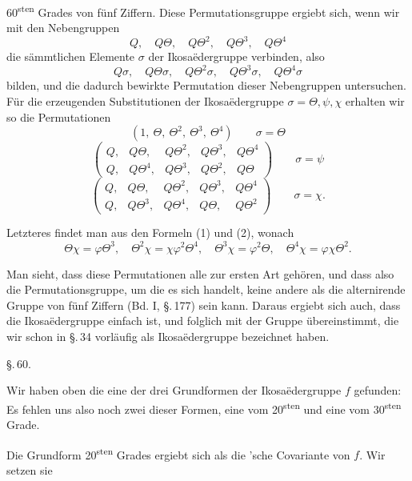 60\textsuperscript{sten} Grades von fünf Ziffern. Diese Permutationsgruppe ergiebt sich, wenn wir mit den Nebengruppen
\[
Q, \quad Q\Theta, \quad Q\Theta^2, \quad Q\Theta^3, \quad Q\Theta^4
\]
die sämmtlichen Elemente $\sigma$ der Ikosa\"edergruppe verbinden, also
\[
Q\sigma, \quad Q\Theta\sigma, \quad Q\Theta^2\sigma, \quad Q\Theta^3\sigma, \quad Q\Theta^4\sigma
\]
bilden, und die dadurch bewirkte Permutation dieser Nebengruppen untersuchen. Für die erzeugenden Substitutionen der Ikosa\"edergruppe $\sigma = \Theta, \psi, \chi$ erhalten wir so die Permutationen
\[
(1, \ \Theta, \ \Theta^2, \ \Theta^3, \ \Theta^4) \qquad \sigma = \Theta
\]
\[
\begin{pmatrix} Q, & Q\Theta, & Q\Theta^2, & Q\Theta^3, & Q\Theta^4 \\ Q, & Q\Theta^4, & Q\Theta^3, & Q\Theta^2, & Q\Theta \end{pmatrix} \qquad \sigma = \psi
\]
\[
\begin{pmatrix} Q, & Q\Theta, & Q\Theta^2, & Q\Theta^3, & Q\Theta^4 \\ Q, & Q\Theta^3, & Q\Theta^4, & Q\Theta, & Q\Theta^2 \end{pmatrix} \qquad \sigma = \chi.
\]

Letzteres findet man aus den Formeln (1) und (2), wonach
\[
\Theta\chi = \varphi\Theta^3, \quad \Theta^2\chi = \chi\varphi^2\Theta^4, \quad \Theta^3\chi = \varphi^2\Theta, \quad \Theta^4\chi = \varphi\chi\Theta^2.
\]

Man sieht, dass diese Permutationen alle zur ersten Art gehören, und dass also die Permutationsgruppe, um die es sich handelt, keine andere als die alternirende Gruppe von fünf Ziffern (Bd. I, \S.\,177) sein kann. Daraus ergiebt sich auch, dass die Ikosa\"edergruppe einfach ist, und folglich mit der Gruppe übereinstimmt, die wir schon in \S.\,34 vorläufig als Ikosa\"edergruppe bezeichnet haben.

\begin{center}
\S.\,60.\\[2pt]
\end{center}

Wir haben oben die eine der drei Grundformen der Ikosa\"edergruppe $f$ gefunden:
Es fehlen uns also noch zwei dieser Formen, eine vom 20\textsuperscript{sten} und eine vom 30\textsuperscript{sten} Grade.

Die Grundform 20\textsuperscript{sten} Grades ergiebt sich als die 'sche Covariante von $f$. Wir setzen sie
